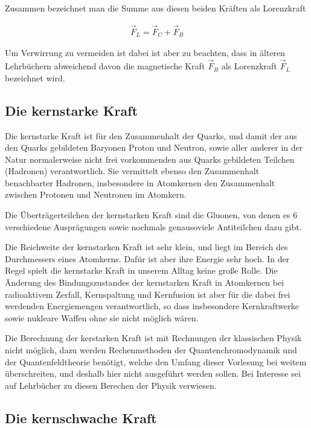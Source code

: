 Zusammen bezeichnet man die Summe aus diesen beiden Kräften als Lorenzkraft

\begin{eqnarray}
\vec{F}_L=\vec{F}_C+\vec{F}_B
\end{eqnarray}


Um Verwirrung zu vermeiden ist dabei ist aber zu beachten, dass in älteren Lehrbüchern abweichend davon die magnetische Kraft $\vec{F}_B$ als Lorenzkraft $\vec{F}_L$ bezeichnet wird.  



\subsection{Die kernstarke Kraft}

Die kernstarke Kraft ist für den Zusammenhalt der Quarks, und damit der aus den Quarks gebildeten Baryonen Proton und Neutron, sowie aller anderer in der Natur normalerweise nicht frei vorkommenden aus Quarks gebildeten Teilchen (Hadronen) verantwortlich. Sie vermittelt ebenso den Zusammenhalt benachbarter Hadronen, insbesondere in Atomkernen den Zusammenhalt zwischen Protonen und Neutronen im Atomkern. 

Die Überträgerteilchen der kernstarken Kraft sind die Gluonen, von denen es 6 verschiedene Ausprägungen sowie nochmals genausoviele Antiteilchen dazu gibt.

Die Reichweite der kernstarken Kraft ist sehr klein, und liegt im Bereich des Durchmessers eines Atomkerns. Dafür ist aber ihre Energie sehr hoch. In der Regel spielt die kernstarke Kraft in unserem Alltag keine große Rolle. Die Änderung des Bindungszustandes der kernstarken Kraft in Atomkernen bei radioaktivem Zerfall, Kernspaltung und Kernfusion ist aber für die dabei frei werdenden Energiemengen verantwortlich, so dass insbesondere Kernkraftwerke sowie nukleare Waffen ohne sie nicht möglich wären.

Die Berechnung der kerstarken Kraft ist mit Rechnungen der klassischen Physik nicht möglich, dazu werden Rechenmethoden der Quantenchromodynamik und der Quantenfeldtheorie benötigt, welche den Umfang dieser Vorlesung bei weitem überschreiten, und deshalb hier nicht ausgeführt werden sollen. Bei Interesse sei auf Lehrbücher zu diesen Berechen der Physik verwiesen.

\subsection{Die kernschwache Kraft}

